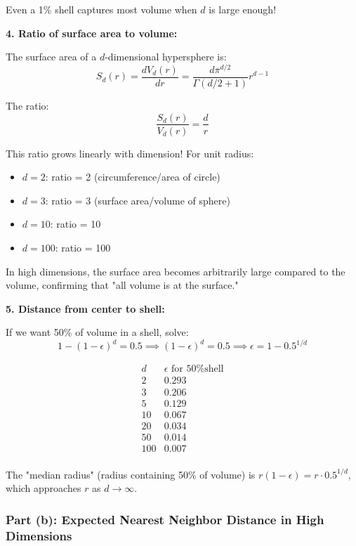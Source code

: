 \documentclass[12pt]{article}
\begin{document}
\begin{computation}
Even a 1\% shell captures most volume when \(d\) is large enough!

\textbf{4. Ratio of surface area to volume:}

The surface area of a \(d\)-dimensional hypersphere is:
\[
S_d(r) = \frac{dV_d(r)}{dr} = \frac{d\pi^{d/2}}{\Gamma(d/2 + 1)} r^{d-1}
\]

The ratio:
\[
\frac{S_d(r)}{V_d(r)} = \frac{d}{r}
\]

This ratio grows linearly with dimension! For unit radius:
\begin{itemize}
    \item \(d=2\): ratio = 2 (circumference/area of circle)
    \item \(d=3\): ratio = 3 (surface area/volume of sphere)
    \item \(d=10\): ratio = 10
    \item \(d=100\): ratio = 100
\end{itemize}

In high dimensions, the surface area becomes arbitrarily large compared to the volume, confirming that "all volume is at the surface."

\textbf{5. Distance from center to shell:}

If we want 50\% of volume in a shell, solve:
\[
1 - (1-\epsilon)^d = 0.5 \implies (1-\epsilon)^d = 0.5 \implies \epsilon = 1 - 0.5^{1/d}
\]

\[
\begin{array}{c|c}
d & \epsilon \text{ for 50\% shell} \\
\hline
2 & 0.293 \\
3 & 0.206 \\
5 & 0.129 \\
10 & 0.067 \\
20 & 0.034 \\
50 & 0.014 \\
100 & 0.007 \\
\end{array}
\]

The "median radius" (radius containing 50\% of volume) is \(r(1-\epsilon) = r \cdot 0.5^{1/d}\), which approaches \(r\) as \(d \to \infty\).
\end{computation}

\subsubsection{Part (b): Expected Nearest Neighbor Distance in High Dimensions}
\end{document}
